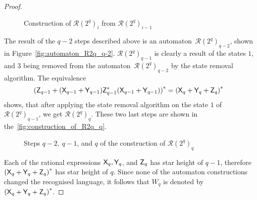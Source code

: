 \begin{proof}
    \begin{figure}[h]%
        \centerline{
            \hspace{-25pt}%
            \quad
            \quad
        }
        \caption{Construction of ${\mathcal{R}(2^q)}_i$ from ${\mathcal{R}(2^q)}_{i-1}$\\ }\label{fig:construction_of_R2q_i}%
    \end{figure}

    The result of the $q-2$ steps described above is an automaton~${\mathcal{R}(2^q)}_{q-2}$, shown in Figure~\ref*{fig:automaton_R2q_q-2}. ${\mathcal{R}(2^q)}_{q-1}$ is clearly a result of the states $1$, and $3$ being removed from the automaton~${\mathcal{R}(2^q)}_{q-2}$ by the state removal algorithm. The equivalence
    \[
        {({\mathsf{Z}}_{q-1} + {({\mathsf{X}}_{q-1} + {\mathsf{Y}}_{q-1})}{\mathsf{Z}}_{q-1}^*{({\mathsf{X}}_{q-1} + {\mathsf{Y}}_{q-1})})}^* = {({\mathsf{X}}_q + {\mathsf{Y}}_q + {\mathsf{Z}}_q)}^*
    \]
    shows, that after applying the state removal algorithm on the state $1$ of ${\mathcal{R}(2^q)}_{q-1}$, we get ${\mathcal{R}(2^q)}_{q}$. These two last steps are shown in the~\autoref*{fig:construction_of_R2q_q}.

    \begin{figure}[h]%
        \centerline{
            \hspace{-25pt}%
            \quad
            \quad
        }
        \caption{Steps $q-2, \: q-1$, and $q$ of the construction of ${\mathcal{R}(2^q)}_q$\\ }\label{fig:construction_of_R2q_q}%
    \end{figure}

    Each of the rational expressions ${\mathsf{X}}_q, {\mathsf{Y}}_q$, and ${\mathsf{Z}}_q$ has star height of $q-1$, therefore ${({\mathsf{X}}_q + {\mathsf{Y}}_q + {\mathsf{Z}}_q)}^*$ has star height of $q$. Since none of the automaton constructions changed the recognised language, it follows that $W_q$ is denoted by ${({\mathsf{X}}_q + {\mathsf{Y}}_q + {\mathsf{Z}}_q)}^*$.
\end{proof}

